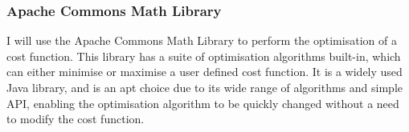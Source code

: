 \subsubsection{Apache Commons Math Library}

I will use the Apache Commons Math Library\cite{apachemath} to perform the optimisation of a cost function. This library has a suite of optimisation algorithms built-in, which can either minimise or maximise a user defined cost function. It is a widely used Java library, and is an apt choice due to its wide range of algorithms and simple API, enabling the optimisation algorithm to be quickly changed without a need to modify the cost function.